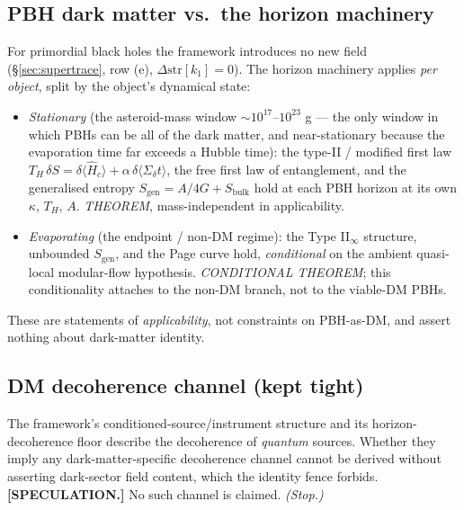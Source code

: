 \documentclass[11pt]{article}
\newcommand{\str}{\mathrm{str}}
\begin{document}
\subsection{PBH dark matter vs.\ the horizon machinery}
For primordial black holes the framework introduces no new field
(\S\ref{sec:supertrace}, row (e), $\Delta\str[k_1]=0$). The horizon machinery
applies \emph{per object}, split by the object's dynamical state:
\begin{itemize}\itemsep2pt
\item \emph{Stationary} (the asteroid-mass window $\sim10^{17}$--$10^{23}$ g ---
the only window in which PBHs can be all of the dark matter, and near-stationary
because the evaporation time far exceeds a Hubble time): the type-II / modified
first law $T_H\,\delta S=\delta\langle\widehat H_c\rangle+\alpha\,
\delta\langle\Sigma_\delta t\rangle$, the free first law of entanglement, and the
generalised entropy $S_{\mathrm{gen}}=A/4G+S_{\mathrm{bulk}}$ hold at each PBH
horizon at its own $\kappa$, $T_H$, $A$. \emph{THEOREM}, mass-independent in
applicability.
\item \emph{Evaporating} (the endpoint / non-DM regime): the Type II$_\infty$
structure, unbounded $S_{\mathrm{gen}}$, and the Page curve hold, \emph{conditional}
on the ambient quasi-local modular-flow hypothesis. \emph{CONDITIONAL THEOREM};
this conditionality attaches to the non-DM branch, not to the viable-DM PBHs.
\end{itemize}
These are statements of \emph{applicability}, not constraints on PBH-as-DM, and
assert nothing about dark-matter identity.

\subsection{DM decoherence channel (kept tight)}
The framework's conditioned-source/instrument structure and its
horizon-decoherence floor describe the decoherence of \emph{quantum} sources.
Whether they imply any dark-matter-specific decoherence channel cannot be
derived without asserting dark-sector field content, which the identity fence
forbids. \textbf{[SPECULATION.]} No such channel is claimed. \emph{(Stop.)}
\end{document}
